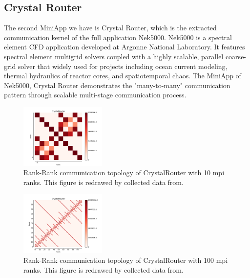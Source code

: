 \documentclass[conference]{IEEEtran}
\begin{document}
\subsection{Crystal Router}
\label{sec:crystalrouter}

The second MiniApp we have is Crystal Router, which is the extracted communication kernel of the full application Nek5000. Nek5000\cite{crystalrouter} is a spectral element CFD application developed at Argonne National Laboratory. It features spectral element multigrid solvers coupled with a highly scalable, parallel coarse-grid solver that widely used for projects including ocean current modeling, thermal hydraulics of reactor cores, and spatiotemporal chaos. The MiniApp of Nek5000, Crystal Router demonstrates the "many-to-many" communication pattern through scalable multi-stage communication process.

\begin{figure}[h!] 
  \centering
  \includegraphics[width=0.38\textwidth]{figs/appstudy/cr/cr10_ct}
   \caption{Rank-Rank communication topology of CrystalRouter with 10 mpi ranks. This figure is redrawed by collected data from\cite{design forward webpage}. }
   \label{fig: crystalrouter10 communication topology}
\end{figure}

\begin{figure}[h!] 
  \centering
  \includegraphics[width=0.38\textwidth]{figs/appstudy/cr/cr100_ct}
   \caption{Rank-Rank communication topology of CrystalRouter with 100 mpi ranks. This figure is redrawed by collected data from\cite{design forward webpage}. }
   \label{fig: crystalrouter100 communication topology}
\end{figure}
\end{document}
